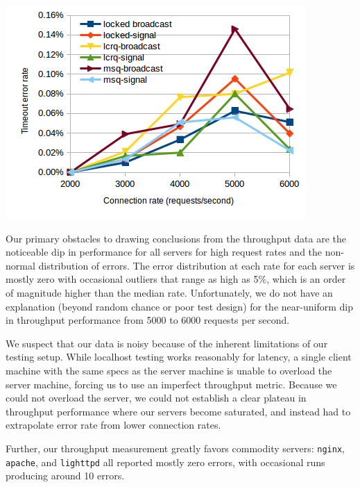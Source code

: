 \documentclass[twoside,10pt]{article}
\newenvironment{Figure}
  {\par\medskip\noindent\minipage{\linewidth}}
  {\endminipage\par\medskip}
\begin{document}
\begin{multicols}{2}
\begin{Figure}
\includegraphics[width=\linewidth]{img/throughputmedian.png}
\end{Figure}

Our primary obstacles to drawing conclusions from the throughput data
are the noticeable dip in performance for all servers for high request
rates and the non-normal distribution of errors. The error
distribution at each rate for each server is mostly zero with
occasional outliers that range as high as 5\%, which is an order of
magnitude higher than the median rate. Unfortunately, we do not have
an explanation (beyond random chance or poor test design) for the
near-uniform dip in throughput performance from 5000 to 6000 requests
per second.

We suspect that our data is noisy because of the inherent limitations
of our testing setup. While localhost testing works reasonably for
latency, a single client machine with the same specs as the server
machine is unable to overload the server machine, forcing us to use an
imperfect throughput metric. Because we could not overload the server,
we could not establish a clear plateau in throughput performance where
our servers become saturated, and instead had to extrapolate error
rate from lower connection rates.

Further, our throughput measurement greatly favors commodity servers:
\verb+nginx+, \verb+apache+, and \verb+lighttpd+ all reported mostly
zero errors, with occasional runs producing around 10 errors.


\end{multicols}
\end{document}
